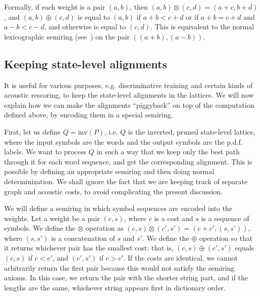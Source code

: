 \documentclass{article}
\def\inv{{\mathrm{inv}}}
\begin{document}
Formally, if each weight is a pair $(a,b)$, then $(a,b) \otimes (c,d) = (a{+}c, b{+}d)$,
and $(a,b) \oplus (c,d)$ is equal to $(a,b)$ if $a{+}b < c{+}d$ or if $a{+}b = c{+}d$ and $a{-}b < c{-}d$,
and otherwise is equal to $(c,d)$.  This is equivalent to the normal lexicographic semiring (see~\cite{roark2011lexicographic}) on the pair $((a{+}b),(a{-}b))$.

\vspace*{-0.075in}
\subsection{Keeping state-level alignments}
\vspace*{-0.05in}

It is useful for various purposes, e.g. discriminative training and certain kinds of
acoustic rescoring, to keep the state-level alignments in the lattices.  We will now
explain how we can make the alignments ``piggyback'' on top of the computation
defined above, by encoding them in a special semiring.

First, let us define $Q = \inv(P)$, i.e. $Q$ is the inverted, pruned state-level lattice,
where the input symbols are the words and the output symbols are the p.d.f. labels.
We want to process $Q$ in such a way that we keep only the best path through it
for each word sequence, and get the corresponding alignment.  This is possible
by defining an appropriate semiring and then doing normal determinization.  We shall
ignore the fact that we are keeping track of separate graph and acoustic costs, 
to avoid complicating the present discussion.  

We will define a semiring in which symbol sequences are encoded into the weights.
Let a weight be a pair $(c, s)$, where $c$ is a cost and $s$ is a sequence of symbols.
We define the $\otimes$ operation as $(c, s) \otimes (c', s') = (c+c', (s,s'))$, where
$(s,s')$ is a concatenation of $s$ and $s'$.  We define the $\oplus$ operation so that
it returns whichever pair has the smallest cost: that is, $(c,s) \oplus (c',s')$ 
equals $(c,s)$ if $c < c'$, and $(c',s')$ if $c > c'$.  If the costs are identical,
we cannot arbitrarily return the first pair because this would not satisfy the semiring
axioms.  In this case, we return the pair with the shorter string part, and if
the lengths are the same, whichever string appears first in dictionary order. 
\end{document}
